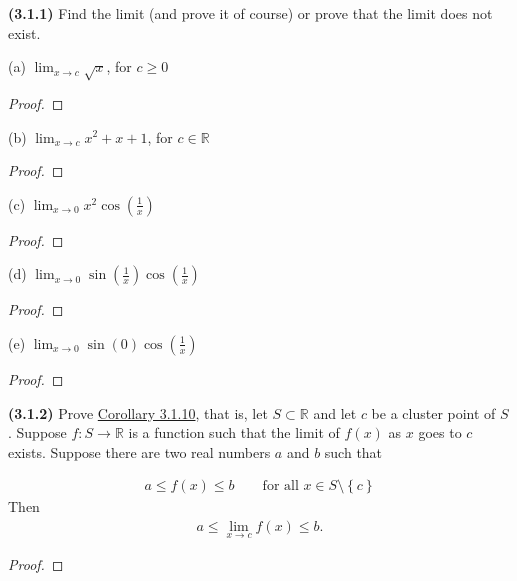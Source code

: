 \documentclass[12pt]{article}
\newcommand{\set}[1]{\left\{ {#1} \right\}}
\newcommand{\limit}[1]{\displaystyle \lim_{ {#1} }}
\newcommand{\paren}[1]{\left( {#1} \right)}
\newcommand{\bR}{\mathbb{R}}
\begin{document}
\newpage

\noindent \textbf{(3.1.1)} Find the limit (and prove it of course) or prove that the limit does not exist.

\noindent (a) $\limit{x\to c} \sqrt{x}$, for $c\ge0$

\begin{proof}
	\lipsum[1][1-5]
\end{proof}

\noindent (b) $\limit{x\to c}x^2 + x + 1$, for $c\in\bR$

\begin{proof}
	\lipsum[1][1-5]
\end{proof}

\noindent (c) $\limit{x\to0}x^2\cos\paren{\frac{1}{x}}$

\begin{proof}
	\lipsum[1][1-5]
\end{proof}

\noindent (d) $\limit{x\to0}\sin\paren{\frac{1}{x}}\cos\paren{\frac{1}{x}}$

\begin{proof}
	\lipsum[1][1-5]
\end{proof}

\noindent (e) $\limit{x\to0}\sin\paren{0}\cos\paren{\frac{1}{x}}$

\begin{proof}
	\lipsum[1][1-5]
\end{proof}
\newpage

\noindent \textbf{(3.1.2)} Prove \underline{Corollary 3.1.10}, that is, let $S\subset\bR$ and let $c$ be a cluster point of $S$. Suppose $f:S\to\bR$ is a function such that the limit of $f(x)$ as $x$ goes to $c$ exists. Suppose there are two real numbers $a$ and $b$ such that

\begin{align*}
	a\le f(x)\le b \qquad \text{for all }x\in S\setminus\set{c}
\end{align*}
\noindent Then
\begin{align*}
	a\le\limit{x\to c}f(x)\le b.
\end{align*}

\begin{proof}
	\lipsum[1]
\end{proof}
\end{document}
